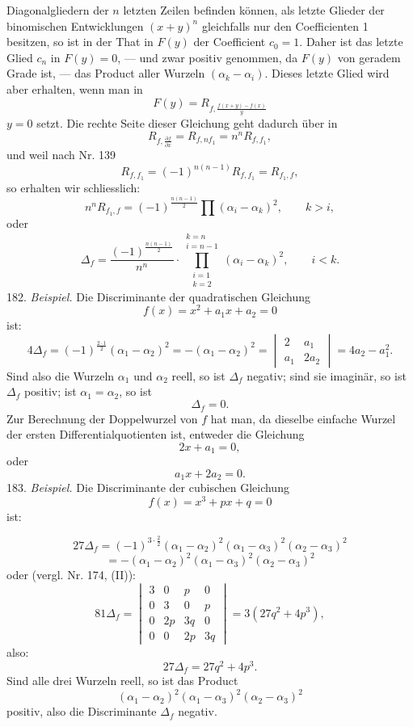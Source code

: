 Diagonalgliedern der $n$ letzten Zeilen befinden können, als letzte
Glieder der binomischen Entwicklungen $(x+y)^n$ gleichfalls nur den
Coefficienten 1 besitzen, so ist in der That in $F(y)$ der Coefficient
$c_0 = 1$. Daher ist das letzte Glied $c_n$ in $F(y) = 0$, --- und zwar
positiv genommen, da $F(y)$ von geradem Grade ist, --- das Product
aller Wurzeln $(\alpha_k - \alpha_i)$. Dieses letzte Glied wird aber erhalten, wenn
man in
\[
F(y) = R_{f, \frac{f(x+y)-f(x)}{y}}
\]
$y=0$ setzt. Die rechte Seite dieser Gleichung geht dadurch über in
\[
R_{f, \frac{\partial f}{\partial x}} = R_{f, nf_1} = n^n R_{f,f_1},
\]
und weil nach Nr. 139
\[
R_{f,f_1} = (-1)^{n(n-1)} R_{f,f_1} = R_{f_1,f}, %
\]
so erhalten wir schliesslich:
\[
n^n R_{f_1,f} = (-1)^{\frac{n(n-1)}{2}} \prod (\alpha_i - \alpha_k)^2, \qquad k>i,
\]
oder
\[
\Delta_f = \frac{(-1)^{\frac{n(n-1)}{2}}}{n^n} \cdot \prod_{\substack{i=1\\k=2}}^{\substack{k=n\\i=n-1}} (\alpha_i - \alpha_k)^2, \qquad i<k.
\]
182. \textit{Beispiel.} Die Discriminante der quadratischen Gleichung
\[
f(x) = x^2 + a_1 x + a_2 = 0
\]
ist:
\[
4\Delta_f = (-1)^{\frac{2\cdot 1}{2}} (\alpha_1-\alpha_2)^2 = -(\alpha_1-\alpha_2)^2 = \begin{vmatrix} 2 & a_1 \\ a_1 & 2a_2 \end{vmatrix} = 4a_2 - a_1^2.
\]
Sind also die Wurzeln $\alpha_1$ und $\alpha_2$ reell, so ist $\Delta_f$ negativ; sind sie
imaginär, so ist $\Delta_f$ positiv; ist $\alpha_1 = \alpha_2$, so ist
\[
\Delta_f = 0.
\]
Zur Berechnung der Doppelwurzel von $f$ hat man, da dieselbe einfache Wurzel der ersten Differentialquotienten ist, entweder die
Gleichung
\[
2x + a_1 = 0,
\]
oder
\[
a_1 x + 2a_2 = 0.
\]
183. \textit{Beispiel.} Die Discriminante der cubischen Gleichung
\[
f(x) = x^3 + px + q = 0
\]
ist:


\[
27\Delta_f = (-1)^{3\cdot\frac{2}{2}}(\alpha_1-\alpha_2)^2(\alpha_1-\alpha_3)^2(\alpha_2-\alpha_3)^2
\]
\[
= -(\alpha_1-\alpha_2)^2(\alpha_1-\alpha_3)^2(\alpha_2-\alpha_3)^2
\]
oder (vergl. Nr. 174, (II)):
\[
81\Delta_f = \begin{vmatrix} 3 & 0 & p & 0 \\ 0 & 3 & 0 & p \\ 0 & 2p & 3q & 0 \\ 0 & 0 & 2p & 3q \end{vmatrix} = 3(27q^2+4p^3),
\]
also:
\[
27\Delta_f = 27q^2+4p^3.
\]
Sind alle drei Wurzeln reell, so ist das Product
\[
(\alpha_1-\alpha_2)^2(\alpha_1-\alpha_3)^2(\alpha_2-\alpha_3)^2
\]
positiv, also die Discriminante $\Delta_f$ negativ.

